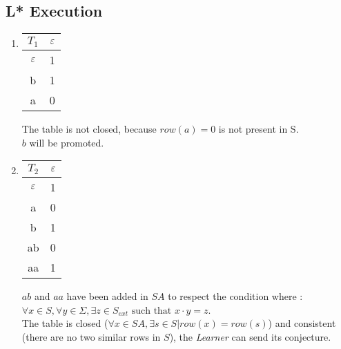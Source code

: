 \subsection{L* Execution}
\begin{enumerate}
  \item \begin{minipage}{0.3\textwidth}
          \begin{tabular}{c||c}
            $T_1$ & $\varepsilon$ \\
            \hline\hline
            $\varepsilon$  & 1    \\
            \hline\hline
            b     & 1    \\
            a     & 0    \\
          \end{tabular}
        \end{minipage} \quad
        \begin{minipage}{0.6\textwidth}
          The table is not closed, because $row(a) = 0$ is not present in S. \\
          $b$ will be promoted.
        \end{minipage}
  \item \begin{minipage}{0.3\textwidth}
          \begin{tabular}{c||c}
            $T_2$ & $\varepsilon$ \\
            \hline\hline
            $\varepsilon$  & 1    \\
            a     & 0    \\
            \hline\hline
            b     & 1    \\
            ab    & 0    \\
            aa    & 1    \\
          \end{tabular}
        \end{minipage}\quad
        \begin{minipage}{0.6\textwidth}
          $ab$ and $aa$ have been added in $SA$ to respect the condition where : $\forall x \in S, \forall y \in \Sigma, \exists z \in S_{ext} \text{ such that } x \cdot y = z $.\\
          The table is closed ($\forall x \in SA, \exists s \in S | row(x) = row(s)$) and consistent (there are no two similar rows in $S$), the \textit{Learner} can send its conjecture.
        \end{minipage}


\end{enumerate}
